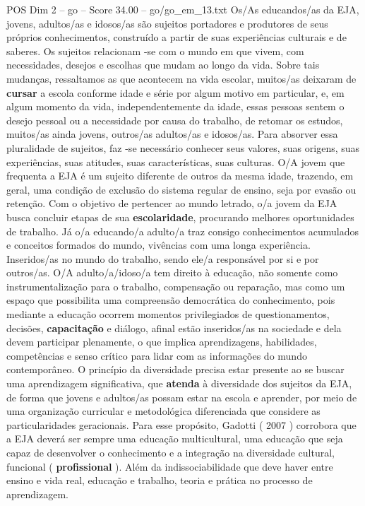 \begin{textsample}{POS Dim 2 – go – Score 34.00 – go/go\_em\_13.txt}
Os/As educandos/as da EJA, jovens, adultos/as e idosos/as são sujeitos portadores e produtores de seus próprios conhecimentos, construído a partir de suas experiências culturais e de saberes.
Os sujeitos relacionam -se com o mundo em que vivem, com necessidades, desejos e escolhas que mudam ao longo da vida.
Sobre tais mudanças, ressaltamos as que acontecem na vida escolar, muitos/as deixaram de \textbf{cursar} a escola conforme idade e série por algum motivo em particular, e, em algum momento da vida, independentemente da idade, essas pessoas sentem o desejo pessoal ou a necessidade por causa do trabalho, de retomar os estudos, muitos/as ainda jovens, outros/as adultos/as e idosos/as.
Para absorver essa pluralidade de sujeitos, faz -se necessário conhecer seus valores, suas origens, suas experiências, suas atitudes, suas características, suas culturas.
O/A jovem que frequenta a EJA é um sujeito diferente de outros da mesma idade, trazendo, em geral, uma condição de exclusão do sistema regular de ensino, seja por evasão ou retenção.
Com o objetivo de pertencer ao mundo letrado, o/a jovem da EJA busca concluir etapas de sua \textbf{escolaridade}, procurando melhores oportunidades de trabalho.
Já o/a educando/a adulto/a traz consigo conhecimentos acumulados e conceitos formados do mundo, vivências com uma longa experiência.
Inseridos/as no mundo do trabalho, sendo ele/a responsável por si e por outros/as.
O/A adulto/a/idoso/a tem direito à educação, não somente como instrumentalização para o trabalho, compensação ou reparação, mas como um espaço que possibilita uma compreensão democrática do conhecimento, pois mediante a educação ocorrem momentos privilegiados de questionamentos, decisões, \textbf{capacitação} e diálogo, afinal estão inseridos/as na sociedade e dela devem participar plenamente, o que implica aprendizagens, habilidades, competências e senso crítico para lidar com as informações do mundo contemporâneo.
O princípio da diversidade precisa estar presente ao se buscar uma aprendizagem significativa, que \textbf{atenda} à diversidade dos sujeitos da EJA, de forma que jovens e adultos/as possam estar na escola e aprender, por meio de uma organização curricular e metodológica diferenciada que considere as particularidades geracionais.
Para esse propósito, Gadotti ( 2007 ) corrobora que a EJA deverá ser sempre uma educação multicultural, uma educação que seja capaz de desenvolver o conhecimento e a integração na diversidade cultural, funcional ( \textbf{profissional} ).
Além da indissociabilidade que deve haver entre ensino e vida real, educação e trabalho, teoria e prática no processo de aprendizagem.

\end{textsample}
